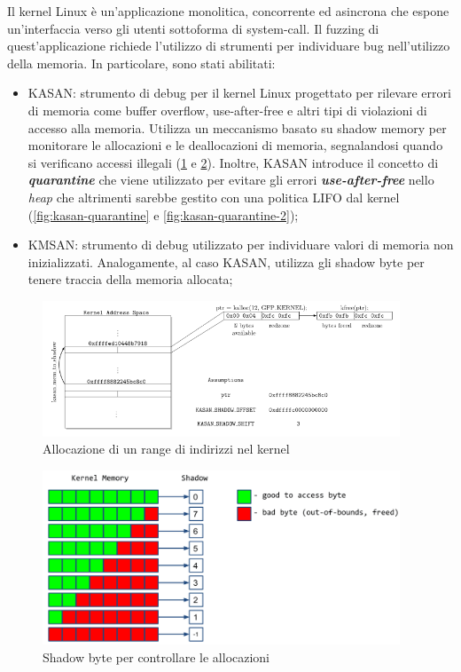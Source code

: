 \documentclass{article}
\begin{document}
Il kernel Linux è un'applicazione monolitica, concorrente ed asincrona che espone un'interfaccia
verso gli utenti sottoforma di system-call. Il fuzzing di quest'applicazione richiede
l'utilizzo di strumenti per individuare bug nell'utilizzo della memoria. In particolare, 
sono stati abilitati:
\begin{itemize}
  \item KASAN: strumento di debug per il kernel Linux progettato per rilevare errori di
    memoria come buffer overflow, use-after-free e altri tipi di violazioni di accesso
    alla memoria. Utilizza un meccanismo basato su shadow memory per monitorare le 
    allocazioni e le deallocazioni di memoria, segnalandosi quando si verificano accessi
    illegali (\cref{fig:kasan} e 
    \cref{fig:kasan-shadow}). Inoltre,
    KASAN introduce il concetto di \textbf{\textit{quarantine}} che viene utilizzato 
    per evitare gli errori \textbf{\textit{use-after-free}} nello \textit{heap} che 
    altrimenti sarebbe gestito con una politica LIFO dal kernel (\cref{fig:kasan-quarantine} e 
    \cref{fig:kasan-quarantine-2});
  \item KMSAN: strumento di debug utilizzato per individuare valori di memoria non 
    inizializzati. Analogamente, al caso KASAN, utilizza gli shadow byte per tenere traccia 
    della memoria allocata;
\end{itemize}

\begin{figure}[h]
  \begin{center}
    \includegraphics[width=0.95\textwidth]{figures/kasan.png}
  \end{center}
  \caption{Allocazione di un range di indirizzi nel kernel}\label{fig:kasan}
\end{figure}

\begin{figure}[h]
  \begin{center}
    \includegraphics[width=0.95\textwidth]{figures/kasan-shadow.png}
  \end{center}
  \caption{Shadow byte per controllare le allocazioni}\label{fig:kasan-shadow}
\end{figure}
\end{document}

